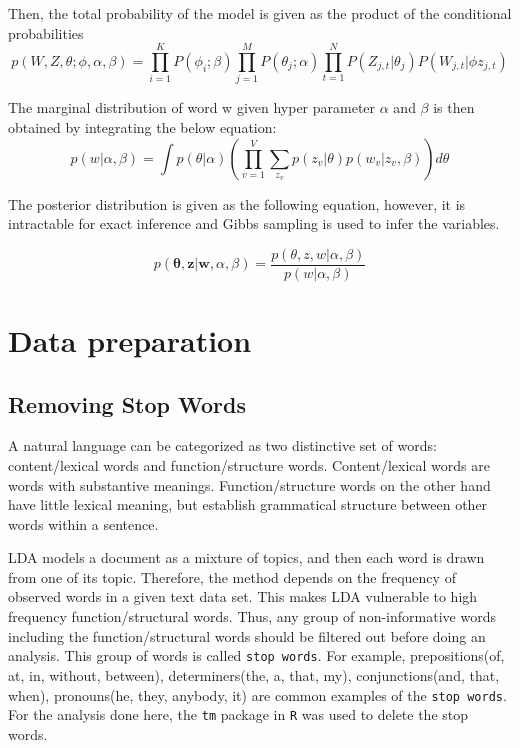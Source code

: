 \documentclass[]{article}
\begin{document}
Then, the total probability of the model is given as the product of the
conditional probabilities
\[p(W, Z, \theta; \phi, \alpha, \beta)=\prod_{i=1}^{K}P(\phi_i;\beta)\prod_{j=1}^{M}P(\theta_j;\alpha)\prod_{t=1}^{N}P(Z_{j,t}|\theta_j)P(W_{j,t}|\phi z_{j,t})\]

The marginal distribution of word w given hyper parameter \(\alpha\) and
\(\beta\) is then obtained by integrating the below equation:
\[p(w|\alpha, \beta)= \int p(\theta|\alpha) \left(\prod_{v=1}^{V} \sum_{z_{v}} p(z_v|\theta)p(w_v|z_v, \beta) \right)d\theta\]

The posterior distribution is given as the following equation, however,
it is intractable for exact inference and Gibbs sampling is used to
infer the variables.

\[p(\boldsymbol\theta, \textbf{z} | \textbf{w}, \alpha, \beta)= \frac{p(\theta, z, w | \alpha, \beta)}{p(w|\alpha, \beta)}\]

\section{Data preparation}\label{data-preparation}



\subsection{Removing Stop Words}\label{removing-stop-words}

A natural language can be categorized as two distinctive set of words:
content/lexical words and function/structure words. Content/lexical
words are words with substantive meanings. Function/structure words on
the other hand have little lexical meaning, but establish grammatical
structure between other words within a sentence.

LDA models a document as a mixture of topics, and then each word is
drawn from one of its topic. Therefore, the method depends on the
frequency of observed words in a given text data set. This makes LDA
vulnerable to high frequency function/structural words. Thus, any group
of non-informative words including the function/structural words should
be filtered out before doing an analysis. This group of words is called
\texttt{stop\ words}. For example, prepositions(of, at, in, without,
between), determiners(the, a, that, my), conjunctions(and, that, when),
pronouns(he, they, anybody, it) are common examples of the
\texttt{stop\ words}. For the analysis done here, the \texttt{tm}
package in \texttt{R} was used to delete the stop words.
\end{document}

